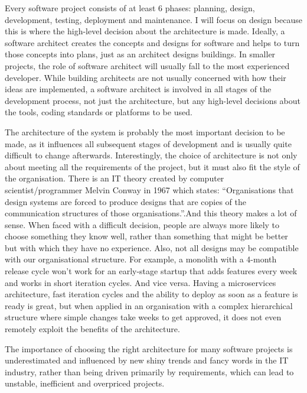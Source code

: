 Every software project consists of at least 6 phases: planning, design, development, testing, deployment and maintenance. I will focus on design because this is where the high-level decision about the architecture is made. Ideally, a software architect creates the concepts and designs for software and helps to turn those concepts into plans, just as an architect designs buildings. In smaller projects, the role of software architect will usually fall to the most experienced developer. While building architects are not usually concerned with how their ideas are implemented, a software architect is involved in all stages of the development process, not just the architecture, but any high-level decisions about the tools, coding standards or platforms to be used.

The architecture of the system is probably the most important decision to be made, as it influences all subsequent stages of development and is usually quite difficult to change afterwards. Interestingly, the choice of architecture is not only about meeting all the requirements of the project, but it must also fit the style of the organisation. There is an IT theory created by computer scientist/programmer Melvin Conway in 1967 which states: ``Organisations that design systems are forced to produce designs that are copies of the communication structures of those organisations.''\cite{paper:conway:1968}.And this theory makes a lot of sense. When faced with a difficult decision, people are always more likely to choose something they know well, rather than something that might be better but with which they have no experience. Also, not all designs may be compatible with our organisational structure. For example, a monolith with a 4-month release cycle won't work for an early-stage startup that adds features every week and works in short iteration cycles. And vice versa. Having a microservices architecture, fast iteration cycles and the ability to deploy as soon as a feature is ready is great, but when applied in an organisation with a complex hierarchical structure where simple changes take weeks to get approved, it does not even remotely exploit the benefits of the architecture.

The importance of choosing the right architecture for many software projects is underestimated and influenced by new shiny trends and fancy words in the IT industry, rather than being driven primarily by requirements, which can lead to unstable, inefficient and overpriced projects.